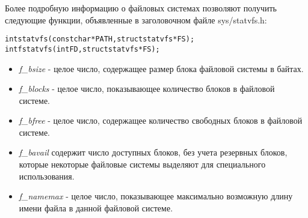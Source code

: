 \documentclass{beamer}
\begin{document}
\begin{frame}[fragile]
Более подробную информацию о файловых системах позволяют получить следующие функции, объявленные в заголовочном файле sys/statvfs.h:
\begin{alltt}
int statvfs (const char * PATH, struct statvfs * FS);
int fstatvfs (int FD, struct statvfs * FS);
\end{alltt}
\begin{itemize}
\item \textit{f\_bsize} - целое число, содержащее размер блока файловой системы в байтах.
\item \textit{f\_blocks} - целое число, показывающее количество блоков в файловой системе.
\item \textit{f\_bfree} - целое число, содержащее количество свободных блоков в файловой системе.
\item \textit{f\_bavail} содержит число доступных блоков, без учета резервных блоков, которые некоторые файловые системы выделяют для специального использования.
\item \textit{f\_namemax} - целое число, показывающее максимально возможную длину имени файла в данной файловой системе. \end{itemize}
\end{frame}


\end{document}
